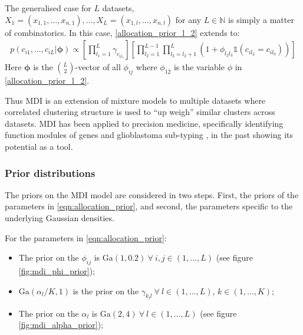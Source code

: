 \documentclass[12pt]{article} %
\begin{document}
	The generalised case for $L$ datasets, $X_1 = (x_{1,1},\ldots,x_{n,1}),\ldots, X_L = (x_{1,l},\ldots,x_{n,l})$ for any $L \in \mathbb{N}$ is simply a matter of combinatorics. In this case, \eqref{allocation_prior_l_2} extends to:
	\begin{align} \label{eqn:allocation_prior}
	p(c_{i1},\ldots,c_{iL} | \boldsymbol{\phi}) \propto \left[\prod_{l_1=1}^L\gamma_{c_{il_1}} \right]\left[\prod_{l_2=1}^{L-1}\prod_{l_3=l_2+1}^L\left(1+\phi_{l_2l_3}\mathbb{1}(c_{il_2} = c_{il_3}) \right)\right]
	\end{align}
	Here $\boldsymbol{\phi}$ is the ${L \choose 2}$-vector of all $\phi_{ij}$ where $\phi_{12}$ is the variable $\phi$ in \eqref{allocation_prior_l_2}.

	Thus MDI is an extension of mixture models to multiple datasets where correlated clustering structure is used to ``up weigh'' similar clusters across datasets. MDI has been applied to precision medicine, specifically identifying function modules of genes and glioblastoma sub-typing \citep{SavageIdentifyingcancersubtypes2013a}, in the past showing its potential as a tool.
	
	\subsubsection{Prior distributions}
	The priors on the MDI model are considered in two steps. First, the priors of the parameters in \eqref{eqn:allocation_prior}, and second, the parameters specific to the underlying Gaussian densities.
	
	For the parameters in \eqref{eqn:allocation_prior}:
	\begin{itemize}
		\item The prior on the $\phi_{ij}$ is $\text{Ga}(1, 0.2) \: \forall \: i,j \in (1, \ldots, L)$ (see figure \ref{fig:mdi_phi_prior}); 
		\item $\text{Ga}(\alpha_l / K, 1)$ is the prior on the $\gamma_{k_ll}  \: \forall \: l \in (1, \ldots, L)$, $k \in (1,\ldots, K)$;
		\item The prior on the $\alpha_l$ is $\text{Ga}(2,4) \: \forall \: l \in (1,\ldots,L)$ (see figure \ref{fig:mdi_alpha_prior});
	\end{itemize}
\end{document}
